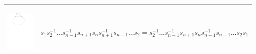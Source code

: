 \documentclass[11pt]{amsart}
\theoremstyle{definition}
\begin{document}
\begin{table}
\begin{tabular}{| p{3.5cm} | p{7cm} |}
\begin{center}\includegraphics[scale = .30]{Diagram4.pdf}\end{center} & $s_{1}s_{2}^{-1} \dots s_{n-1}^{-1}s_{n+1}s_{n}s_{n+1}^{-1}s_{n-1} \dots s_{2} = s_{2}^{-1} \dots s_{n-1}^{-1}s_{n+1}s_{n}s_{n+1}^{-1}s_{n-1} \dots s_{2}s_{1}$ \\ \hline


\end{tabular}
\end{table}
\end{document}
